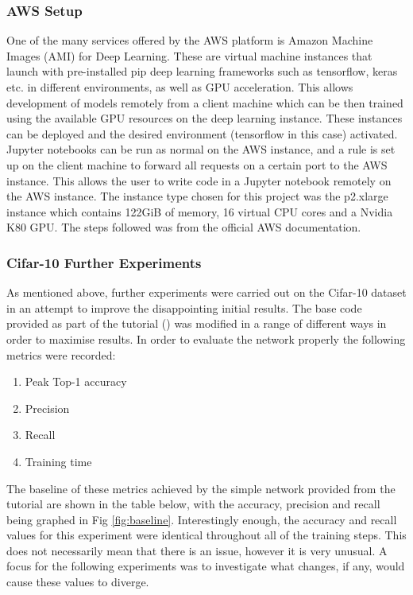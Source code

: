 \documentclass[12pt]{report}
\begin{document}
\subsubsection{AWS Setup}
\begin{flushleft}
One of the many services offered by the AWS platform is Amazon Machine Images (AMI) for Deep Learning. These are virtual machine instances that launch with pre-installed pip deep learning frameworks such as tensorflow, keras etc. in different environments, as well as GPU acceleration. This allows development of models remotely from a client machine which can be then trained using the available GPU resources on the deep learning instance. These instances can be deployed and the desired environment (tensorflow in this case) activated. Jupyter notebooks can be run as normal on the AWS instance, and a rule is set up on the client machine to forward all requests on a certain port to the AWS instance. This allows the user to write code in a Jupyter notebook remotely on the AWS instance. The instance type chosen for this project was the p2.xlarge instance which contains 122GiB of memory, 16 virtual CPU cores and a Nvidia K80 GPU. The steps followed was from the official AWS documentation.
\end{flushleft}

\subsubsection{Cifar-10 Further Experiments}
\begin{flushleft}
As mentioned above, further experiments were carried out on the Cifar-10 dataset in an attempt to improve the disappointing initial results. The base code provided as part of the tutorial (\cite{udemy}) was modified in a range of different ways in order to maximise results. In order to evaluate the network properly the following metrics were recorded:

\begin{enumerate}
  \item Peak Top-1 accuracy
  \item Precision
  \item Recall
  \item Training time
\end{enumerate}

The baseline of these metrics achieved by the simple network provided from the tutorial are shown in the table below, with the accuracy, precision and recall being graphed in Fig \ref{fig:baseline}. Interestingly enough, the accuracy and recall values for this experiment were identical throughout all of the training steps. This does not necessarily mean that there is an issue, however it is very unusual. A focus for the following experiments was to investigate what changes, if any, would cause these values to diverge.
\end{flushleft}
\end{document}
